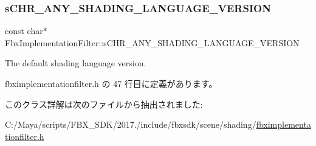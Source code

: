 \subsubsection{\texorpdfstring{s\+C\+H\+R\+\_\+\+A\+N\+Y\+\_\+\+S\+H\+A\+D\+I\+N\+G\+\_\+\+L\+A\+N\+G\+U\+A\+G\+E\+\_\+\+V\+E\+R\+S\+I\+ON}{sCHR\_ANY\_SHADING\_LANGUAGE\_VERSION}}
{\footnotesize\ttfamily const char$\ast$ Fbx\+Implementation\+Filter\+::s\+C\+H\+R\+\_\+\+A\+N\+Y\+\_\+\+S\+H\+A\+D\+I\+N\+G\+\_\+\+L\+A\+N\+G\+U\+A\+G\+E\+\_\+\+V\+E\+R\+S\+I\+ON\hspace{0.3cm}{\ttfamily [static]}}

The default shading language version. 

 fbximplementationfilter.\+h の 47 行目に定義があります。



このクラス詳解は次のファイルから抽出されました\+:\begin{DoxyCompactItemize}
\item 
C\+:/\+Maya/scripts/\+F\+B\+X\+\_\+\+S\+D\+K/2017./include/fbxsdk/scene/shading/\hyperlink{fbximplementationfilter_8h}{fbximplementationfilter.\+h}\end{DoxyCompactItemize}
